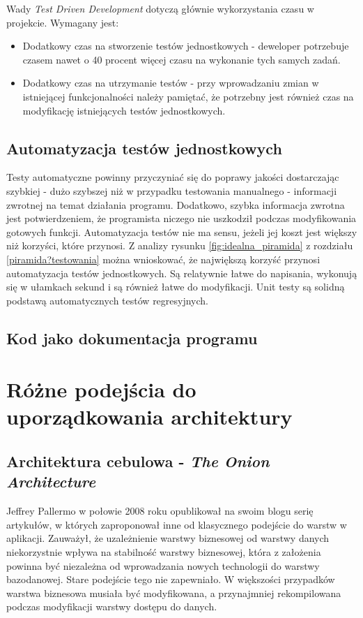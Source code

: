 Wady \textit{Test Driven Development} dotyczą głównie wykorzystania czasu w projekcie. Wymagany jest:

\begin{itemize}
\item
Dodatkowy czas na stworzenie testów jednostkowych - deweloper potrzebuje czasem nawet o 40 procent więcej czasu na wykonanie tych samych zadań.
\item
Dodatkowy czas na utrzymanie testów - przy wprowadzaniu zmian w istniejącej funkcjonalności należy pamiętać, że potrzebny jest również czas na modyfikację istniejących testów jednostkowych.
\end{itemize}

\subsection{Automatyzacja testów jednostkowych}
Testy automatyczne powinny przyczyniać się do poprawy jakości dostarczając szybkiej - dużo szybszej niż w przypadku testowania manualnego - informacji zwrotnej na temat działania programu. Dodatkowo, szybka informacja zwrotna jest potwierdzeniem, że programista niczego nie uszkodził podczas modyfikowania gotowych funkcji.
Automatyzacja testów nie ma sensu, jeżeli jej koszt jest większy niż korzyści, które przynosi. Z analizy rysunku \ref{fig:idealna_piramida} z rozdziału \ref{piramida?testowania} można wnioskować, że największą korzyść przynosi automatyzacja testów jednostkowych. Są relatywnie łatwe do napisania, wykonują się w ułamkach sekund i są również łatwe do modyfikacji. Unit testy są solidną podstawą automatycznych testów regresyjnych.

\subsection{Kod jako dokumentacja programu}


\section{Różne podejścia do uporządkowania architektury}
\subsection{Architektura cebulowa - \textit{The Onion Architecture}}
Jeffrey Pallermo w połowie 2008 roku opublikował na swoim blogu serię artykułów\cite{website:architect:onion}, w których zaproponował inne od klasycznego podejście do warstw w aplikacji. Zauważył, że uzależnienie warstwy biznesowej od warstwy danych niekorzystnie wpływa na stabilność warstwy biznesowej, która z założenia powinna być niezależna od wprowadzania nowych technologii do warstwy bazodanowej. Stare podejście tego nie zapewniało. W większości przypadków warstwa biznesowa musiała być modyfikowana, a przynajmniej rekompilowana podczas modyfikacji warstwy dostępu do danych.

